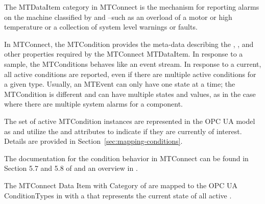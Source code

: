 The  \gls{MTDataItem} \gls{category} in MTConnect is the mechanism for reporting alarms on the machine classified by  and --such as an overload of a motor or high temperature or a collection of system level warnings or faults.

In MTConnect, the \gls{MTCondition} provides the meta-data describing the , , and other properties required by the MTConnect \gls{MTDataItem}. In response to a \gls{sample}, the \glspl{MTCondition} behaves like an event stream. In response to a \gls{current}, all active conditions are reported, even if there are multiple active conditions for a given type. Usually, an \gls{MTEvent} can only have one state at a time; the \gls{MTCondition} is different and can have multiple states and values, as in the case where there are multiple system alarms for a component.

The set of active \gls{MTCondition} instances are represented in the OPC UA model as  and utilize the  and  attributes to indicate if they are currently of interest. Details are provided in Section~\ref{sec:mapping-conditions}.

The documentation for the condition behavior in MTConnect can be found in Section 5.7 and 5.8 of \cite{MTCPart3} and an overview in \cite{MTCPart2}.

The MTConnect Data Item with Category of  are mapped to the OPC UA \glspl{ConditionType} in \cite{UAPart9} with a  that represents the current state of all active .

